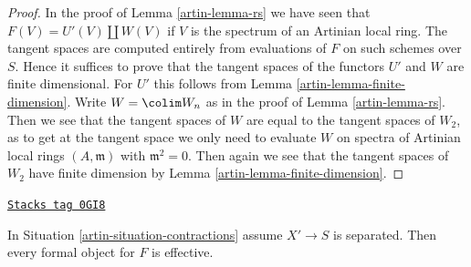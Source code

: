 \begin{proof}

In the proof of Lemma \ref{artin-lemma-rs} we have seen that
$F(V) = U'(V) \amalg W(V)$ if $V$ is the spectrum of an Artinian
local ring. The tangent spaces are computed entirely from evaluations
of $F$ on such schemes over $S$.
Hence it suffices to prove that the tangent spaces
of the functors $U'$ and $W$ are finite dimensional.
For $U'$ this follows from
Lemma \ref{artin-lemma-finite-dimension}.
Write $W = \colim W_n$ as in the proof of Lemma \ref{artin-lemma-rs}.
Then we see that the tangent spaces of $W$ are equal to the
tangent spaces of $W_2$, as to get at the tangent space
we only need to evaluate $W$ on spectra of Artinian local
rings $(A, \mathfrak m)$ with $\mathfrak m^2 = 0$.
Then again we see that the tangent spaces of $W_2$ have
finite dimension by
Lemma \ref{artin-lemma-finite-dimension}.
\end{proof}

\begin{lemma}
\label{artin-lemma-formal-object-effective}
\href{https://stacks.math.columbia.edu/tag/0GI8}{\texttt{Stacks tag 0GI8}}

In Situation \ref{artin-situation-contractions} assume $X' \to S$ is separated.
Then every formal object for $F$ is effective.
\end{lemma}

